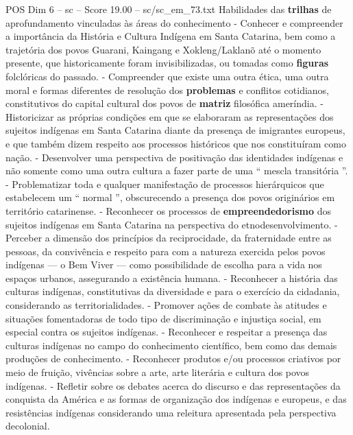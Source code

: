 \begin{textsample}{POS Dim 6 – sc – Score 19.00 – sc/sc\_em\_73.txt}
Habilidades das \textbf{trilhas} de aprofundamento vinculadas às áreas do conhecimento - Conhecer e compreender a importância da História e Cultura Indígena em Santa Catarina, bem como a trajetória dos povos Guarani, Kaingang e Xokleng/Laklanõ até o momento presente, que historicamente foram invisibilizadas, ou tomadas como \textbf{figuras} folclóricas do passado. - Compreender que existe uma outra ética, uma outra moral e formas diferentes de resolução dos \textbf{problemas} e conflitos cotidianos, constitutivos do capital cultural dos povos de \textbf{matriz} filosófica ameríndia. - Historicizar as próprias condições em que se elaboraram as representações dos sujeitos indígenas em Santa Catarina diante da presença de imigrantes europeus, e que também dizem respeito aos processos históricos que nos constituíram como nação. - Desenvolver uma perspectiva de positivação das identidades indígenas e não somente como uma outra cultura a fazer parte de uma “ mescla transitória ”. - Problematizar toda e qualquer manifestação de processos hierárquicos que estabelecem um “ normal ”, obscurecendo a presença dos povos originários em território catarinense. - Reconhecer os processos de \textbf{empreendedorismo} dos sujeitos indígenas em Santa Catarina na perspectiva do etnodesenvolvimento. - Perceber a dimensão dos princípios da reciprocidade, da fraternidade entre as pessoas, da convivência e respeito para com a natureza exercida pelos povos indígenas — o Bem Viver — como possibilidade de escolha para a vida nos espaços urbanos, assegurando a existência humana. - Reconhecer a história das culturas indígenas, constitutivas da diversidade e para o exercício da cidadania, considerando as territorialidades. - Promover ações de combate às atitudes e situações fomentadoras de todo tipo de discriminação e injustiça social, em especial contra os sujeitos indígenas. - Reconhecer e respeitar a presença das culturas indígenas no campo do conhecimento científico, bem como das demais produções de conhecimento. - Reconhecer produtos e/ou processos criativos por meio de fruição, vivências sobre a arte, arte literária e cultura dos povos indígenas. - Refletir sobre os debates acerca do discurso e das representações da conquista da América e as formas de organização dos indígenas e europeus, e das resistências indígenas considerando uma releitura apresentada pela perspectiva decolonial.

\end{textsample}
